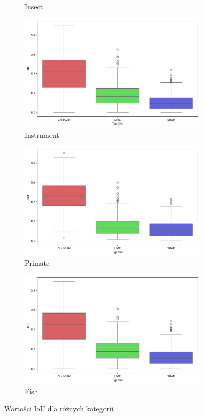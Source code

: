\begin{figure}[h]
\begin{subfigure}[b]{0.3\textwidth}
		\caption{Insect}
	\end{subfigure}
	\begin{subfigure}[b]{0.3\textwidth}
		\centering\includegraphics[width=.9\textwidth]{img/base_iou_music}
		\caption{Instrument}
	\end{subfigure}
	\begin{subfigure}[b]{0.3\textwidth}
		\centering\includegraphics[width=.9\textwidth]{img/base_iou_primate}
		\caption{Primate}
	\end{subfigure}
	\begin{subfigure}[b]{0.3\textwidth}
		\centering\includegraphics[width=.9\textwidth]{img/base_iou_fish}
		\caption{Fish}
	\end{subfigure}
	\caption{Wartości IoU dla różnych kategorii}
	\label{rys:base_iou_category}
\end{figure}

